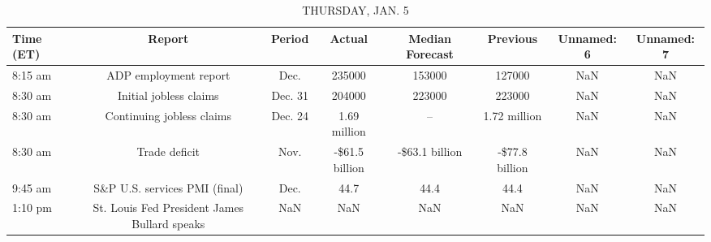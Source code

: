 \documentclass{article}%
\begin{document}
%


\begin{table}[htbp]%
\caption{THURSDAY, JAN. 5}%
\centering%
\begin{adjustbox}{width=1\textwidth}%
\begin{tabular}{lccccccc}
\toprule
Time (ET) &                                       Report &  Period &         Actual & Median Forecast &       Previous & Unnamed: 6 & Unnamed: 7 \\
\midrule
  8:15 am &                        ADP employment report &    Dec. &         235000 &          153000 &         127000 &        NaN &        NaN \\
  8:30 am &                       Initial jobless claims & Dec. 31 &         204000 &          223000 &         223000 &        NaN &        NaN \\
  8:30 am &                    Continuing jobless claims & Dec. 24 &   1.69 million &              -- &   1.72 million &        NaN &        NaN \\
  8:30 am &                                Trade deficit &    Nov. & -\$61.5 billion &  -\$63.1 billion & -\$77.8 billion &        NaN &        NaN \\
  9:45 am &                S\&P U.S. services PMI (final) &    Dec. &           44.7 &            44.4 &           44.4 &        NaN &        NaN \\
  1:10 pm & St. Louis Fed President James Bullard speaks &     NaN &            NaN &             NaN &            NaN &        NaN &        NaN \\
\bottomrule
\end{tabular}
%
\end{adjustbox}%
\end{table}

%
\end{document}
